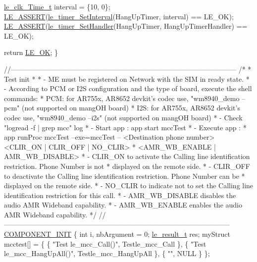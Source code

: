 \begin{DoxyCodeInclude}
{{{{{{    \hyperlink{structle__clk___time__t}{le\_clk\_Time\_t} interval = \{10, 0\};
    \hyperlink{le__log_8h_ac0dbbef91dc0fed449d0092ff0557b39}{LE\_ASSERT}(\hyperlink{le__timer_8h_a0a103d5cef5e83fc9088859d527bbd43}{le\_timer\_SetInterval}(HangUpTimer, interval) == LE\_OK);
    \hyperlink{le__log_8h_ac0dbbef91dc0fed449d0092ff0557b39}{LE\_ASSERT}(\hyperlink{le__timer_8h_a8fb341f11e0da2692453df997613cb8e}{le\_timer\_SetHandler}(HangUpTimer, HangUpTimerHandler) == LE\_OK);

    \textcolor{keywordflow}{return} \hyperlink{le__basics_8h_a1cca095ed6ebab24b57a636382a6c86ca5066a4bcec691c6b67843b8f79656422}{LE\_OK};
\}

\textcolor{comment}{//--------------------------------------------------------------------------------------------------}
\textcolor{comment}{/*}
\textcolor{comment}{ * Test init}
\textcolor{comment}{ *}
\textcolor{comment}{ * - ME must be registered on Network with the SIM in ready state.}
\textcolor{comment}{ * - According to PCM or I2S configuration and the type of board, execute the shell commands:}
\textcolor{comment}{ *   PCM: for AR755x, AR8652 devkit's codec use, "wm8940\_demo --pcm" (not supported on mangOH board)}
\textcolor{comment}{ *   I2S: for AR755x, AR8652 devkit's codec use, "wm8940\_demo --i2s" (not supported on mangOH board)}
\textcolor{comment}{ * - Check "logread -f | grep mcc" log}
\textcolor{comment}{ * - Start app : app start mccTest}
\textcolor{comment}{ * - Execute app :}
\textcolor{comment}{ *  app runProc mccTest --exe=mccTest -- <Destination phone number> <CLIR\_ON | CLIR\_OFF | NO\_CLIR>}
\textcolor{comment}{ *  <AMR\_WB\_ENABLE | AMR\_WB\_DISABLE>}
\textcolor{comment}{ *   - CLIR\_ON to activate the Calling line identification restriction. Phone Number is not}
\textcolor{comment}{ * displayed on the remote side.}
\textcolor{comment}{ *   - CLIR\_OFF to deactivate the Calling line identification restriction. Phone Number can be}
\textcolor{comment}{ * displayed on the remote side.}
\textcolor{comment}{ *   - NO\_CLIR to indicate not to set the Calling line identification restriction for this call.}
\textcolor{comment}{ *   - AMR\_WB\_DISABLE disables the audio AMR Wideband capability.}
\textcolor{comment}{ *   - AMR\_WB\_ENABLE enables the audio AMR Wideband capability.}
\textcolor{comment}{ */}
\textcolor{comment}{//--------------------------------------------------------------------------------------------------}
\hyperlink{le__event_loop_8h_abdb9187a56836a93d19cc793cbd4b7ec}{COMPONENT\_INIT}
\{
    \textcolor{keywordtype}{int} i, nbArgument = 0;
    \hyperlink{le__basics_8h_a1cca095ed6ebab24b57a636382a6c86c}{le\_result\_t} res;
    myStruct mcctest[] =
    \{
                    \{ \textcolor{stringliteral}{"Test le\_mcc\_Call()"},         Testle\_mcc\_Call \},
                    \{ \textcolor{stringliteral}{"Test le\_mcc\_HangUpAll()"},    Testle\_mcc\_HangUpAll \},
                    \{ \textcolor{stringliteral}{""}, NULL \}
    \};

}}}}}}
\end{DoxyCodeInclude}
